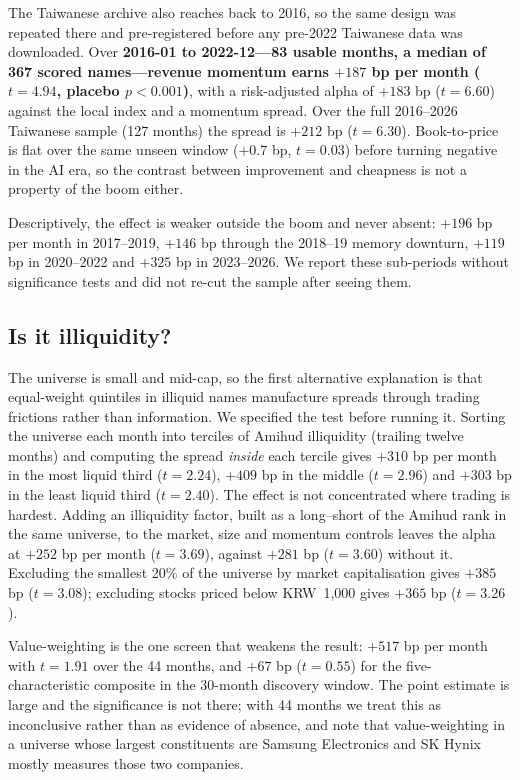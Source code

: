 \documentclass[12pt,a4paper]{article}
\begin{document}
The Taiwanese archive also reaches back to 2016, so the same design was repeated there and pre-registered before any pre-2022 Taiwanese data was downloaded. Over \textbf{2016-01 to 2022-12---83 usable months, a median of 367 scored names---revenue momentum earns $+187$ bp per month ($t=4.94$, placebo $p<0.001$)}, with a risk-adjusted alpha of $+183$ bp ($t=6.60$) against the local index and a momentum spread. Over the full 2016--2026 Taiwanese sample (127 months) the spread is $+212$ bp ($t=6.30$). Book-to-price is flat over the same unseen window ($+0.7$ bp, $t=0.03$) before turning negative in the AI era, so the contrast between improvement and cheapness is not a property of the boom either.

Descriptively, the effect is weaker outside the boom and never absent: $+196$ bp per month in 2017--2019, $+146$ bp
through the 2018--19 memory downturn, $+119$ bp in 2020--2022 and $+325$ bp in 2023--2026. We report these sub-periods
without significance tests and did not re-cut the sample after seeing them.

\subsection{Is it illiquidity?}

The universe is small and mid-cap, so the first alternative explanation is that equal-weight quintiles in illiquid names
manufacture spreads through trading frictions rather than information. We specified the test before running it. Sorting
the universe each month into terciles of Amihud illiquidity (trailing twelve months) and computing the spread
\emph{inside} each tercile gives $+310$ bp per month in the most liquid third ($t=2.24$), $+409$ bp in the middle
($t=2.96$) and $+303$ bp in the least liquid third ($t=2.40$). The effect is not concentrated where trading is hardest.
Adding an illiquidity factor, built as a long--short of the Amihud rank in the same universe, to the market, size and
momentum controls leaves the alpha at $+252$ bp per month ($t=3.69$), against $+281$ bp ($t=3.60$) without it. Excluding
the smallest 20\% of the universe by market capitalisation gives $+385$ bp ($t=3.08$); excluding stocks priced below
KRW~1{,}000 gives $+365$ bp ($t=3.26$).

Value-weighting is the one screen that weakens the result: $+517$ bp per month with $t=1.91$ over the 44 months, and
$+67$ bp ($t=0.55$) for the five-characteristic composite in the 30-month discovery window. The point estimate is large and the
significance is not there; with 44 months we treat this as inconclusive rather than as evidence of absence, and note
that value-weighting in a universe whose largest constituents are Samsung Electronics and SK Hynix mostly measures those
two companies.
\end{document}
